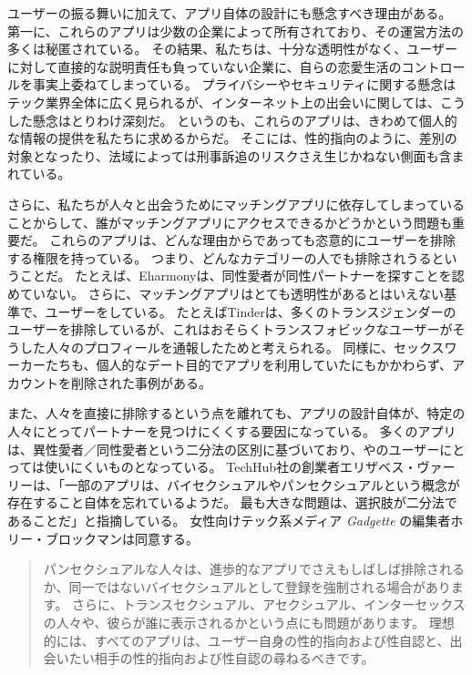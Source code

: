 \documentclass[paper=a4,book,openany]{jlreq} \usepackage{mystyle}
\begin{document}
ユーザーの振る舞いに加えて、アプリ自体の設計にも懸念すべき理由がある。
第一に、これらのアプリは少数の企業によって所有されており、その運営方法の多くは秘匿されている。
その結果、私たちは、十分な透明性がなく、ユーザーに対して直接的な説明責任も負っていない企業に、自らの恋愛生活のコントロールを事実上委ねてしまっている。
プライバシーやセキュリティに関する懸念はテック業界全体に広く見られるが、インターネット上の出会いに関しては、こうした懸念はとりわけ深刻だ。
というのも、これらのアプリは、きわめて個人的な情報の提供を私たちに求めるからだ。
そこには、性的指向のように、差別の対象となったり、法域によっては刑事訴追のリスクさえ生じかねない側面も含まれている。

さらに、私たちが人々と出会うためにマッチングアプリに依存してしまっていることからして、誰がマッチングアプリにアクセスできるかどうかという問題も重要だ。
これらのアプリは、どんな理由からであっても恣意的にユーザーを排除する権限を持っている。
つまり、どんなカテゴリーの人でも排除されうるということだ。
たとえば、Eharmonyは、同性愛者が同性パートナーを探すことを認めていない。
さらに、マッチングアプリはとても透明性があるとはいえない基準で、ユーザーをしている。
たとえばTinderは、多くのトランスジェンダーのユーザーを排除しているが、これはおそらくトランスフォビックなユーザーがそうした人々のプロフィールを通報したためと考えられる\citep{tierney17:_why_are_tran}。
同様に、セックスワーカーたちも、個人的なデート目的でアプリを利用していたにもかかわらず、アカウントを削除された事例がある\citep{al-othman18:_sex_work_say}。

また、人々を直接に排除するという点を離れても、アプリの設計自体が、特定の人々にとってパートナーを見つけにくくする要因になっている。
多くのアプリは、異性愛者／同性愛者という二分法の区別に基づいており、やのユーザーにとっては使いにくいものとなっている。
TechHub社の創業者エリザベス・ヴァーリーは、「一部のアプリは、バイセクシュアルやパンセクシュアルという概念が存在すること自体を忘れているようだ。
最も大きな問題は、選択肢が二分法であることだ」と指摘している。
女性向けテック系メディア \emph{Gadgette} の編集者ホリー・ブロックマンは同意する。

\begin{quote}
  パンセクシュアルな人々は、進歩的なアプリでさえもしばしば排除されるか、同一ではないバイセクシュアルとして登録を強制される場合があります。
さらに、トランスセクシュアル、アセクシュアル、インターセックスの人々や、彼らが誰に表示されるかという点にも問題があります。
理想的には、すべてのアプリは、ユーザー自身の性的指向および性自認と、出会いたい相手の性的指向および性自認の尋ねるべきです。
\citep{knowles16:_bisex_prob}
\end{quote}
\end{document}
